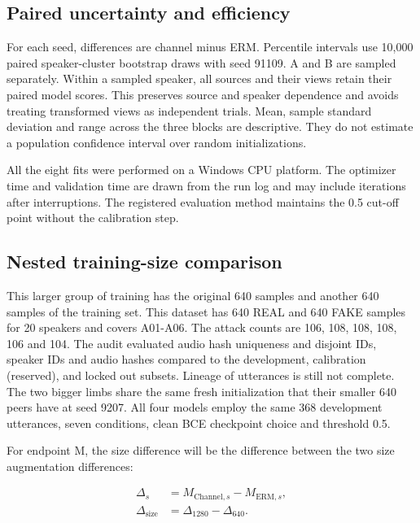 \subsection{Paired uncertainty and efficiency}

For each seed, differences are channel minus ERM. Percentile intervals use 10,000 paired speaker-cluster bootstrap draws with seed 91109. A and B are sampled separately. Within a sampled speaker, all sources and their views retain their paired model scores. This preserves source and speaker dependence and avoids treating transformed views as independent trials. Mean, sample standard deviation and range across the three blocks are descriptive. They do not estimate a population confidence interval over random initializations.

All the eight fits were performed on a Windows CPU platform. The optimizer time and validation time are drawn from the run log and may include iterations after interruptions. The registered evaluation method maintains the 0.5 cut-off point without the calibration step.

\subsection{Nested training-size comparison}\label{sec:size-design}

This larger group of training has the original 640 samples and another 640 samples of the training set. This dataset has 640 REAL and 640 FAKE samples for 20 speakers and covers A01-A06. The attack counts are 106, 108, 108, 108, 106 and 104. The audit evaluated audio hash uniqueness and disjoint IDs, speaker IDs and audio hashes compared to the development, calibration (reserved), and locked out subsets. Lineage of utterances is still not complete. The two bigger limbs share the same fresh initialization that their smaller 640 peers have at seed 9207. All four models employ the same 368 development utterances, seven conditions, clean BCE checkpoint choice and threshold 0.5.

For endpoint M, the size difference will be the difference between the two size augmentation differences:

\begin{equation}\label{eq:size-contrast}
\begin{split}
\Delta_s &= M_{\mathrm{Channel},s}-M_{\mathrm{ERM},s},\\
\Delta_{\mathrm{size}} &= \Delta_{1280}-\Delta_{640}.
\end{split}
\end{equation}

